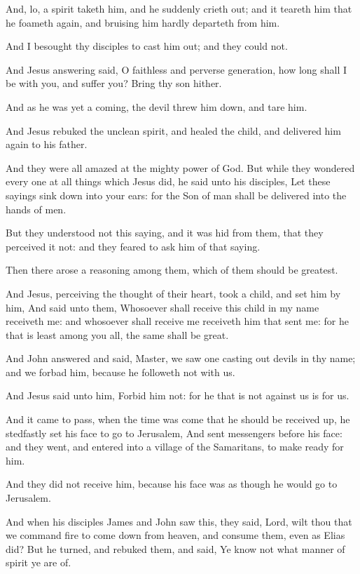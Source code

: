\verse And, lo, a spirit taketh him, and he suddenly crieth out; and it teareth him that he foameth again, and bruising him hardly departeth from him.

\verse And I besought thy disciples to cast him out; and they could not.

\verse And Jesus answering said, O faithless and perverse generation, how long shall I be with you, and suffer you? Bring thy son hither.

\verse And as he was yet a coming, the devil threw him down, and tare him.

And Jesus rebuked the unclean spirit, and healed the child, and delivered him again to his father.

\verse And they were all amazed at the mighty power of God. But while they wondered every one at all things which Jesus did, he said unto his disciples, \verse Let these sayings sink down into your ears: for the Son of man shall be delivered into the hands of men.

\verse But they understood not this saying, and it was hid from them, that they perceived it not: and they feared to ask him of that saying.

\verse Then there arose a reasoning among them, which of them should be greatest.

\verse And Jesus, perceiving the thought of their heart, took a child, and set him by him, \verse And said unto them, Whosoever shall receive this child in my name receiveth me: and whosoever shall receive me receiveth him that sent me: for he that is least among you all, the same shall be great.

\verse And John answered and said, Master, we saw one casting out devils in thy name; and we forbad him, because he followeth not with us.

\verse And Jesus said unto him, Forbid him not: for he that is not against us is for us.

\verse And it came to pass, when the time was come that he should be received up, he stedfastly set his face to go to Jerusalem, \verse And sent messengers before his face: and they went, and entered into a village of the Samaritans, to make ready for him.

\verse And they did not receive him, because his face was as though he would go to Jerusalem.

\verse And when his disciples James and John saw this, they said, Lord, wilt thou that we command fire to come down from heaven, and consume them, even as Elias did?  \verse But he turned, and rebuked them, and said, Ye know not what manner of spirit ye are of.

